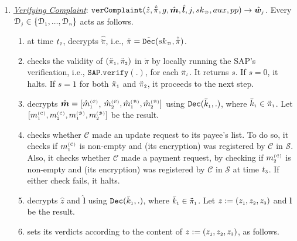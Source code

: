 \begin{enumerate}[leftmargin=.46cm]


\item\label{VerifyingComplaint}  \underline{\textit{Verifying Complaint}}: $\mathtt{verComplaint}(\hat z, \hat{\ddot{\pi}}, g, \hat {\bm m}, \hat{\bm{l}},  j, \\{sk}_{\scriptscriptstyle\mathcal {D}}, aux, pp)\rightarrow \hat{\bm w}_{\scriptscriptstyle j}$.
%
Every $\mathcal{D}_{\scriptscriptstyle j}\in\{\mathcal{D}_{\scriptscriptstyle 1}, ..., \mathcal{D}_{\scriptscriptstyle n}\}$ acts as follows.
\begin{enumerate}

%
\item at time $t_{\scriptscriptstyle 7}$, decrypts $\hat{\ddot{\pi}}$, i.e., ${\ddot{\pi}}={\tilde{\mathtt {Dec}}}({sk}_{\scriptscriptstyle\mathcal {D}}, \hat{\ddot \pi})$. 

\item checks the validity  of $(\ddot{\pi}_{\scriptscriptstyle 1}, \ddot{\pi}_{\scriptscriptstyle 2})$ in $\ddot{\pi}$ by locally running  the SAP's verification, i.e., $\mathtt{SAP.verify}(.)$, for each  $\ddot{\pi}_{\scriptscriptstyle i}$. It   returns  $s$. If $s=0$, it halts. If $s=1$ for both $\ddot{\pi}_{\scriptscriptstyle 1}$ and  $\ddot{\pi}_{\scriptscriptstyle 2}$, it proceeds to the next step. 
%
\item decrypts $\hat{\bm m}=[\hat{m}_{\scriptscriptstyle 1}^{\scriptscriptstyle(\mathcal C)}$, $\hat{m}_{\scriptscriptstyle 2}^{\scriptscriptstyle(\mathcal C)}, \hat{m}_{\scriptscriptstyle 1}^{\scriptscriptstyle(\mathcal B)}, \hat{m}_{\scriptscriptstyle 2}^{\scriptscriptstyle(\mathcal B)}]$  using $\mathtt{Dec}(\bar k_{\scriptscriptstyle 1},.)$, where $\bar k_{\scriptscriptstyle 1}\in\ddot \pi_{\scriptscriptstyle 1}$. Let $[{m}_{\scriptscriptstyle 1}^{\scriptscriptstyle(\mathcal C)},  {m}_{\scriptscriptstyle 2}^{\scriptscriptstyle(\mathcal C)},  {m}_{\scriptscriptstyle 1}^{\scriptscriptstyle(\mathcal B)}, {m}_{\scriptscriptstyle 2}^{\scriptscriptstyle(\mathcal B)}]$ be the result. 

\item  checks whether $\mathcal C$ made an update request to its payee's list. To do so, it checks if  $m_{\scriptscriptstyle 1}^{\scriptscriptstyle(\mathcal C)}$  is non-empty and (its encryption) was registered by $\mathcal{C}$ in $\mathcal{S}$. Also, it checks whether $\mathcal C$ made a payment request, by checking if $m_{\scriptscriptstyle 2}^{\scriptscriptstyle(\mathcal C)}$ is non-empty and (its encryption) was registered by $\mathcal{C}$ in $\mathcal{S}$ at time $t_{\scriptscriptstyle 3}$.  If either check fails, it halts. 
\item decrypts $\hat z$ and $\hat{\bm{l}}$ using $\mathtt{Dec}(\bar k_{\scriptscriptstyle 1},.)$, where $\bar k_{\scriptscriptstyle 1}\in\ddot \pi_{\scriptscriptstyle 1}$. Let $ z:=(z_{\scriptscriptstyle 1}, z_{\scriptscriptstyle 2}, z_{\scriptscriptstyle 3})$ and ${\bm{l}}$ be the result. 
%
\item\label{auditors-verdict} sets its verdicts according to  the content of  $z:=(z_{\scriptscriptstyle 1}, z_{\scriptscriptstyle 2}, z_{\scriptscriptstyle 3})$, as follows.  
%
\begin{itemize}


\end{itemize}
\end{enumerate}
\end{enumerate}
